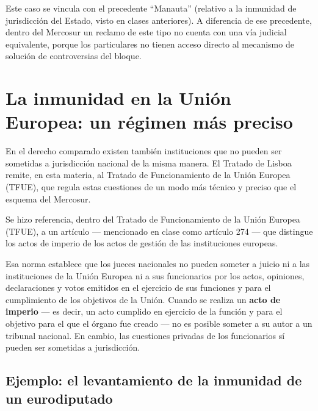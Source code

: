 \documentclass[12pt,oneside]{book}
\begin{document}
Este caso se vincula con el precedente ``Manauta'' (relativo a la inmunidad de jurisdicción del Estado, visto en clases anteriores). A diferencia de ese precedente, dentro del Mercosur un reclamo de este tipo no cuenta con una vía judicial equivalente, porque los particulares no tienen acceso directo al mecanismo de solución de controversias del bloque.

\section{La inmunidad en la Unión Europea: un régimen más preciso}

En el derecho comparado existen también instituciones que no pueden ser sometidas a jurisdicción nacional de la misma manera. El Tratado de Lisboa remite, en esta materia, al Tratado de Funcionamiento de la Unión Europea (TFUE), que regula estas cuestiones de un modo más técnico y preciso que el esquema del Mercosur.

\begin{note}
Se hizo referencia, dentro del Tratado de Funcionamiento de la Unión Europea (TFUE), a un artículo --- mencionado en clase como artículo 274 --- que distingue los actos de imperio de los actos de gestión de las instituciones europeas.
\end{note}

Esa norma establece que los jueces nacionales no pueden someter a juicio ni a las instituciones de la Unión Europea ni a sus funcionarios por los actos, opiniones, declaraciones y votos emitidos en el ejercicio de sus funciones y para el cumplimiento de los objetivos de la Unión. Cuando se realiza un \textbf{acto de imperio} --- es decir, un acto cumplido en ejercicio de la función y para el objetivo para el que el órgano fue creado --- no es posible someter a su autor a un tribunal nacional. En cambio, las cuestiones privadas de los funcionarios sí pueden ser sometidas a jurisdicción.

\subsection{Ejemplo: el levantamiento de la inmunidad de un eurodiputado}
\end{document}
